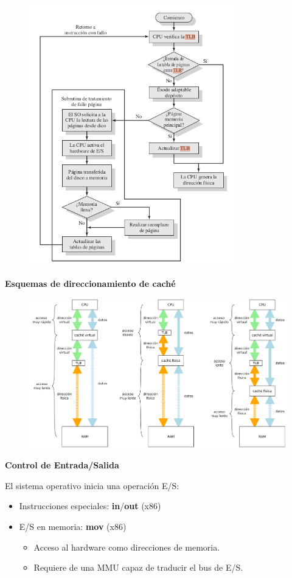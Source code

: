 \documentclass{article}
\begin{document}
\begin{figure}[h]
\centering
\includegraphics[scale=1,width=90mm]{TLB.png}
\end{figure}

\newpage

\textbf{Esquemas de direccionamiento de caché}
\begin{figure}[h]
\centering
\includegraphics[scale=1,width=\textwidth]{esquemacache.png}
\end{figure}

\textbf{Control de Entrada/Salida}

El sistema operativo inicia una operación E/S:
\begin{itemize}
\item Instrucciones especiales: \textbf{in}/\textbf{out} (x86)

\item E/S en memoria: \textbf{mov} (x86)
	\begin{itemize}
	\item Acceso al hardware como direcciones de memoria.
	\item Requiere de una MMU capaz de traducir el bus de E/S.
	\end{itemize}
\end{itemize}
\end{document}
